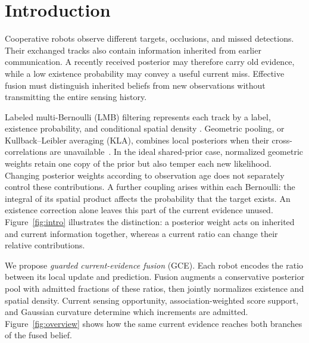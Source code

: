 \section{Introduction}
Cooperative robots observe different targets, occlusions, and missed
detections. Their exchanged tracks also contain information inherited
from earlier communication. A recently received posterior may therefore
carry old evidence, while a low existence probability may convey a useful
current miss. Effective fusion must distinguish inherited beliefs from
new observations without transmitting the entire sensing history.

Labeled multi-Bernoulli (LMB) filtering represents each track by a label,
existence probability, and conditional spatial density
\cite{vo2013conjugate,reuter2014lmb}. Geometric pooling, or Kullback--Leibler averaging
(KLA), combines local posteriors when their cross-correlations are
unavailable~\cite{battistelli2014kla}. In the ideal shared-prior case,
normalized geometric weights retain one copy of the prior but also temper
each new likelihood. Changing posterior weights according to observation
age does not separately control these contributions. A further coupling
arises within each Bernoulli: the integral of its spatial product affects
the probability that the target exists. An existence correction alone
leaves this part of the current evidence unused.
Figure~\ref{fig:intro} illustrates the distinction: a posterior weight
acts on inherited and current information together, whereas a current
ratio can change their relative contributions.

We propose \emph{guarded current-evidence fusion} (GCE). Each robot encodes
the ratio between its local update and prediction. Fusion augments a
conservative posterior pool with admitted fractions of these ratios,
then jointly normalizes existence and spatial density. Current sensing
opportunity, association-weighted score support, and Gaussian curvature
determine which increments are admitted. Figure~\ref{fig:overview} shows
how the same current evidence reaches both branches of the fused belief.



